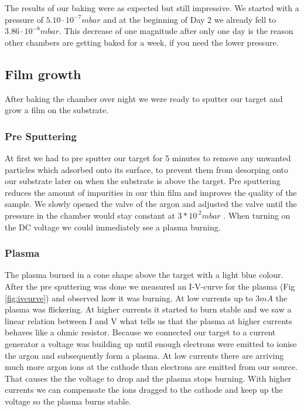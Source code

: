 \documentclass[]{article}
\begin{document}
The results of our baking were as expected but still impressive. We started with a pressure of $5.10 \cdot 10^{-7} mbar$ and at the beginning of Day 2 we already fell to $3.86 \cdot 10^{-8} mbar $. This decrease of one magnitude after only one day is the reason other chambers are getting baked for a week, if you need the lower pressure.

\subsection{Film growth}
After baking the chamber over night we were ready to sputter our target and grow a film on the substrate. 

\subsubsection{Pre Sputtering}
At first we had to pre sputter our target for 5 minutes to remove any unwanted particles which adsorbed onto its surface, to prevent them from desorping onto our substrate later on when the substrate is above the target. Pre sputtering reduces the amount of impurities in our thin film and improves the quality of the sample.  We slowly opened the valve of the argon and adjusted the valve until the pressure in the chamber would stay constant at $3*10^{.2}mbar$ . When turning on the DC voltage we could immediately see a plasma burning.

\subsubsection{Plasma}
The plasma burned in a cone shape above the target with a light blue colour. After the pre sputtering was done we measured an I-V-curve for the plasma (Fig \ref{fig:ivcurve}) and observed how it was burning. At low currents up to $3mA$ the plasma was flickering. At higher currents it started to burn stable and we saw a linear relation between I and V what tells us that the plasma at higher currents behaves like a ohmic resistor. Because we connected our target to a current generator a voltage was building up until enough electrons were emitted to ionise the argon and subsequently form a plasma. At low currents there are arriving much more argon ions at the cathode than electrons are emitted from our source. That causes the the voltage to drop and the plasma stops burning. With higher currents we can compensate the ions dragged to the cathode and keep up the voltage so the plasma burns stable.
\end{document}
